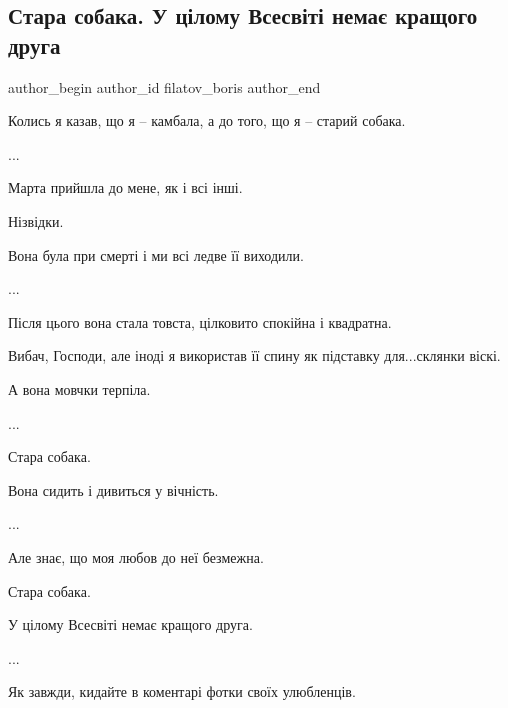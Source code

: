  
 
 
 
 

\subsection{Стара собака. У цілому Всесвіті немає кращого друга}
\label{sec:16_06_2023.fb.filatov_boris.1.stara_sobaka_u_cilomu_vsesviti_nemae_kraschogo_druga}

\ifcmt
 author_begin
   author_id filatov_boris
 author_end
\fi

Колись я казав, що я – камбала, а до того, що я – старий собака.\par
...\par
Марта прийшла до мене, як і всі інші.\par
Нізвідки.\par
Вона була при смерті і ми всі ледве її виходили.\par
...\par
Після цього вона стала товста, цілковито спокійна і квадратна.\par
Вибач, Господи, але іноді я використав її спину як підставку для...склянки віскі.\par
А вона мовчки терпіла.\par
...\par
Стара собака.\par
Вона сидить і дивиться у вічність.\par
...\par
Але знає, що моя любов до неї безмежна.\par
Стара собака.\par
У цілому Всесвіті немає кращого друга.\par
...\par
Як завжди, кидайте в коментарі фотки своїх улюбленців.\par


